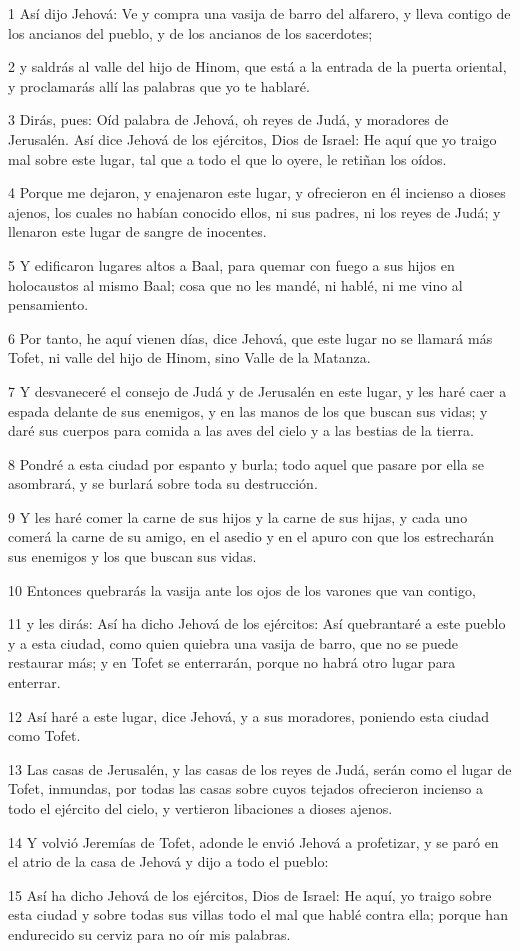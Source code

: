 \par 1 Así dijo Jehová: Ve y compra una vasija de barro del alfarero, y lleva contigo de los ancianos del pueblo, y de los ancianos de los sacerdotes;
\par 2 y saldrás al valle del hijo de Hinom, que está a la entrada de la puerta oriental, y proclamarás allí las palabras que yo te hablaré.
\par 3 Dirás, pues: Oíd palabra de Jehová, oh reyes de Judá, y moradores de Jerusalén. Así dice Jehová de los ejércitos, Dios de Israel: He aquí que yo traigo mal sobre este lugar, tal que a todo el que lo oyere, le retiñan los oídos.
\par 4 Porque me dejaron, y enajenaron este lugar, y ofrecieron en él incienso a dioses ajenos, los cuales no habían conocido ellos, ni sus padres, ni los reyes de Judá; y llenaron este lugar de sangre de inocentes.
\par 5 Y edificaron lugares altos a Baal, para quemar con fuego a sus hijos en holocaustos al mismo Baal; cosa que no les mandé, ni hablé, ni me vino al pensamiento.
\par 6 Por tanto, he aquí vienen días, dice Jehová, que este lugar no se llamará más Tofet, ni valle del hijo de Hinom, sino Valle de la Matanza.
\par 7 Y desvaneceré el consejo de Judá y de Jerusalén en este lugar, y les haré caer a espada delante de sus enemigos, y en las manos de los que buscan sus vidas; y daré sus cuerpos para comida a las aves del cielo y a las bestias de la tierra.
\par 8 Pondré a esta ciudad por espanto y burla; todo aquel que pasare por ella se asombrará, y se burlará sobre toda su destrucción.
\par 9 Y les haré comer la carne de sus hijos y la carne de sus hijas, y cada uno comerá la carne de su amigo, en el asedio y en el apuro con que los estrecharán sus enemigos y los que buscan sus vidas.
\par 10 Entonces quebrarás la vasija ante los ojos de los varones que van contigo,
\par 11 y les dirás: Así ha dicho Jehová de los ejércitos: Así quebrantaré a este pueblo y a esta ciudad, como quien quiebra una vasija de barro, que no se puede restaurar más; y en Tofet se enterrarán, porque no habrá otro lugar para enterrar.
\par 12 Así haré a este lugar, dice Jehová, y a sus moradores, poniendo esta ciudad como Tofet.
\par 13 Las casas de Jerusalén, y las casas de los reyes de Judá, serán como el lugar de Tofet, inmundas, por todas las casas sobre cuyos tejados ofrecieron incienso a todo el ejército del cielo, y vertieron libaciones a dioses ajenos.
\par 14 Y volvió Jeremías de Tofet, adonde le envió Jehová a profetizar, y se paró en el atrio de la casa de Jehová y dijo a todo el pueblo:
\par 15 Así ha dicho Jehová de los ejércitos, Dios de Israel: He aquí, yo traigo sobre esta ciudad y sobre todas sus villas todo el mal que hablé contra ella; porque han endurecido su cerviz para no oír mis palabras.

